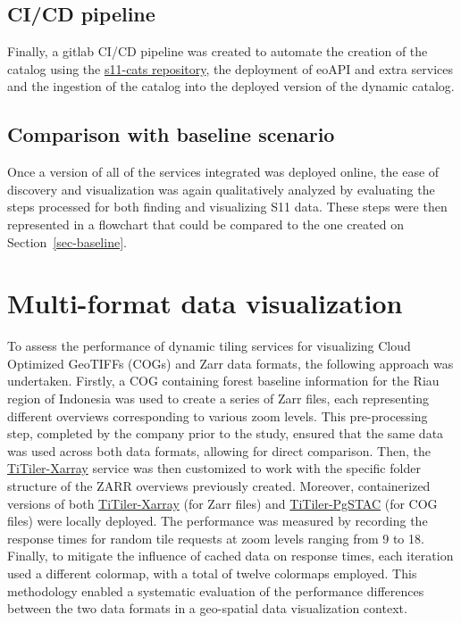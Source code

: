 \documentclass[
  oneside,
  open=any]{scrbook}
\begin{document}
\subsection{CI/CD pipeline}\label{cicd-pipeline}

Finally, a gitlab CI/CD pipeline was created to automate the creation of
the catalog using the
\href{https://gitlab.com/satelligence/s11-cats}{s11-cats repository},
the deployment of eoAPI and extra services and the ingestion of the
catalog into the deployed version of the dynamic catalog.

\subsection{Comparison with baseline
scenario}\label{comparison-with-baseline-scenario}

Once a version of all of the services integrated was deployed online,
the ease of discovery and visualization was again qualitatively analyzed
by evaluating the steps processed for both finding and visualizing S11
data. These steps were then represented in a flowchart that could be
compared to the one created on Section~\ref{sec-baseline}.

\section{Multi-format data
visualization}\label{multi-format-data-visualization}

To assess the performance of dynamic tiling services for visualizing
Cloud Optimized GeoTIFFs (COGs) and Zarr data formats, the following
approach was undertaken. Firstly, a COG containing forest baseline
information for the Riau region of Indonesia was used to create a series
of Zarr files, each representing different overviews corresponding to
various zoom levels. This pre-processing step, completed by the company
prior to the study, ensured that the same data was used across both data
formats, allowing for direct comparison. Then, the
\href{https://github.com/developmentseed/titiler-xarray}{TiTiler-Xarray}
service was then customized to work with the specific folder structure
of the ZARR overviews previously created. Moreover, containerized
versions of both
\href{https://github.com/developmentseed/titiler-xarray}{TiTiler-Xarray}
(for Zarr files) and
\href{https://github.com/stac-utils/titiler-pgstac}{TiTiler-PgSTAC} (for
COG files) were locally deployed. The performance was measured by
recording the response times for random tile requests at zoom levels
ranging from 9 to 18. Finally, to mitigate the influence of cached data
on response times, each iteration used a different colormap, with a
total of twelve colormaps employed. This methodology enabled a
systematic evaluation of the performance differences between the two
data formats in a geo-spatial data visualization context.
\end{document}
